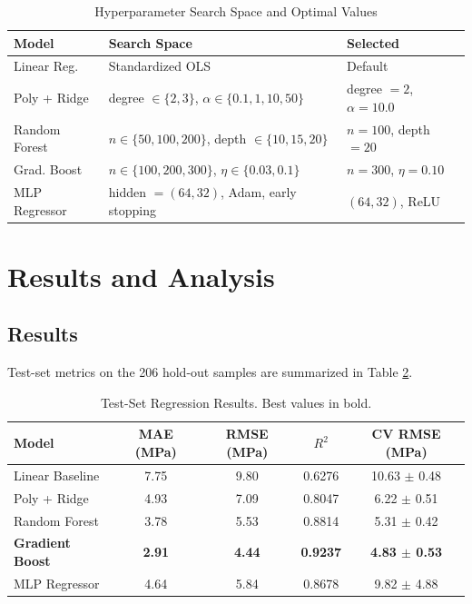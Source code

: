 \documentclass[conference,10pt]{IEEEtran}
\begin{document}
\begin{table}[htbp]
\caption{Hyperparameter Search Space and Optimal Values}
\label{tab:params}
\centering
\begin{tabular}{lll}
\toprule
\textbf{Model} & \textbf{Search Space} & \textbf{Selected} \\
\midrule
Linear Reg. & Standardized OLS & Default \\
Poly + Ridge & degree $\in \{2, 3\}$, $\alpha \in \{0.1, 1, 10, 50\}$ & degree $= 2$, $\alpha = 10.0$ \\
Random Forest & $n \in \{50, 100, 200\}$, depth $\in \{10, 15, 20\}$ & $n = 100$, depth $= 20$ \\
Grad. Boost & $n \in \{100, 200, 300\}$, $\eta \in \{0.03, 0.1\}$ & $n = 300$, $\eta = 0.10$ \\
MLP Regressor & hidden $=(64, 32)$, Adam, early stopping & $(64, 32)$, ReLU \\
\bottomrule
\end{tabular}
\end{table}

\section{Results and Analysis}
\subsection{Results}
Test-set metrics on the 206 hold-out samples are summarized in Table \ref{tab:results}.

\begin{table}[htbp]
\caption{Test-Set Regression Results. Best values in bold.}
\label{tab:results}
\centering
\begin{tabular}{lcccc}
\toprule
\textbf{Model} & \textbf{MAE (MPa)} & \textbf{RMSE (MPa)} & \textbf{$R^2$} & \textbf{CV RMSE (MPa)} \\
\midrule
Linear Baseline & 7.75 & 9.80 & 0.6276 & 10.63 $\pm$ 0.48 \\
Poly + Ridge & 4.93 & 7.09 & 0.8047 & 6.22 $\pm$ 0.51 \\
Random Forest & 3.78 & 5.53 & 0.8814 & 5.31 $\pm$ 0.42 \\
\textbf{Gradient Boost} & \textbf{2.91} & \textbf{4.44} & \textbf{0.9237} & \textbf{4.83 $\pm$ 0.53} \\
MLP Regressor & 4.64 & 5.84 & 0.8678 & 9.82 $\pm$ 4.88 \\
\bottomrule
\end{tabular}
\end{table}
\end{document}

